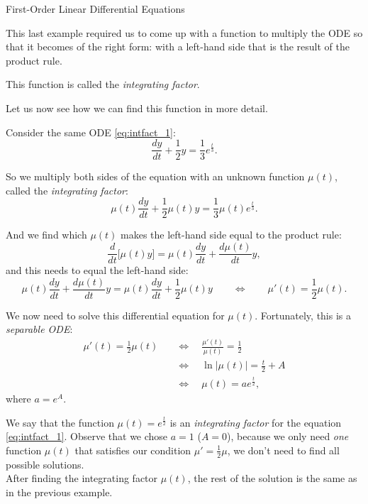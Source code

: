 \begin{submodule}{First-Order Linear Differential Equations}
\begin{example}
\end{example}


This last example required us to come up with a function to multiply the ODE so that it becomes of the right form: with a left-hand side that is the result of the product rule.

This function is called the \emph{integrating factor}.

Let us now see how we can find this function in more detail.


\begin{example}
Consider the same ODE \eqref{eq:intfact_1}:
\begin{equation}\tag{$\star$}
\frac{dy}{dt} + \frac12 y = \frac13 e^{\frac t3}.
\end{equation}

So we multiply both sides of the equation with an unknown function $\mu(t)$, called the \emph{integrating factor}:
$$%
\mu(t) \frac{dy}{dt} + \frac12 \mu(t) y = \frac13 \mu(t) e^{\frac t3}.
$$%

And we find which $\mu(t)$ makes the left-hand side equal to the product rule:
$$
\frac{d}{dt} \big[ \mu(t) y \big] 
	= \mu(t) \frac{dy}{dt} + \frac{d \mu(t)}{dt} y,
$$
and this needs to equal the left-hand side:
$$
\mu(t) \frac{dy}{dt} + \frac{d \mu(t)}{dt} y = \mu(t) \frac{dy}{dt} + \frac12 \mu(t) y
\qquad \Leftrightarrow \qquad
	\mu'(t) = \frac12 \mu(t).
$$

We now need to solve this differential equation for $\mu(t)$. Fortunately, this is a \emph{separable ODE}:
\begin{align*}
\mu'(t) = \frac12 \mu(t) \quad
	& \Leftrightarrow \quad \frac{\mu'(t)}{\mu(t)} = \frac12 \\
	& \Leftrightarrow \quad \ln |\mu(t)| = \frac t2  + A\\
	& \Leftrightarrow \quad \mu(t) = a e^{\frac t2},
\end{align*}
where $a = e^A$.

We say that the function $\mu(t) = e^{\frac t2}$ is an \emph{integrating factor} for the equation \eqref{eq:intfact_1}.
Observe that we chose $a=1$ ($A=0$), because we only need \emph{one} function $\mu(t)$ that satisfies our condition $\mu' = \frac12 \mu$, we don't need to find all possible solutions. \\


After finding the integrating factor $\mu(t)$, the rest of the solution is the same as in the previous example.
%
%
\end{example}



\end{submodule}
